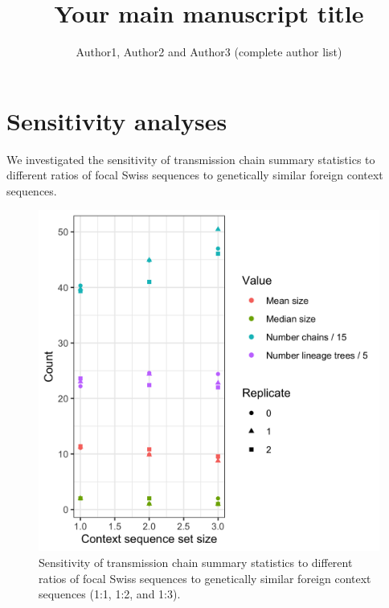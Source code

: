 \documentclass[9pt,twoside,lineno]{pnas-new}
\title{Your main manuscript title}
\author{Author1, Author2 and Author3 (complete author list)}
\begin{document}
\instructionspage  

\maketitle

\SItext


\section{Sensitivity analyses}
We investigated the sensitivity of transmission chain summary statistics to different ratios of focal Swiss sequences to genetically similar foreign context sequences. 

\begin{figure}[tbhp]
\centering
\includegraphics[width = 0.8\linewidth]{figures/fig_SX_sensitivity_context_set_size.png}
\caption{Sensitivity of transmission chain summary statistics to different ratios of focal Swiss sequences to genetically similar foreign context sequences (1:1, 1:2, and 1:3).}  
\label{fig:sensitivity_context_set_size}
\end{figure}
\end{document}
